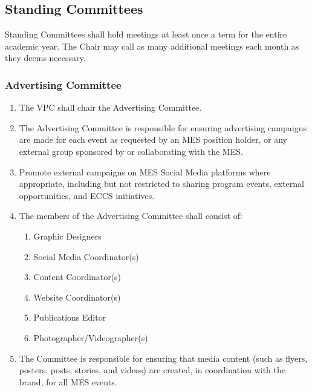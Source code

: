 \subsection{Standing Committees}
\label{standing-committees}
Standing Committees shall hold meetings at least once a term for the
entire academic year. The Chair may call as many additional meetings
each month as they deems necessary.

\subsubsection{Advertising Committee}
\label{advertising-committee}

\begin{enumerate}
 \item
  The VPC shall chair the Advertising Committee.
 \item
  The Advertising Committee is responsible for ensuring advertising campaigns are made for each event as requested by an MES position holder, or any external group sponsored by or collaborating with the MES.
 \item
  Promote external campaigns on MES Social Media platforms where appropriate, including but not restricted to sharing program events, external opportunities, and ECCS initiatives.
 \item
  The members of the Advertising Committee shall consist of:

  \begin{enumerate}
   \item
    Graphic Designers
   \item
    Social Media Coordinator(s)
   \item
    Content Coordinator(s) 
   \item     
    Website Coordinator(s)
   \item
    Publications Editor
   \item
    Photographer/Videographer(s)
  \end{enumerate}
 \item
  The Committee is responsible for ensuring that media content (such as flyers, posters, posts, stories, and videos) are created, in coordination with the brand, for all MES events.

\end{enumerate}

